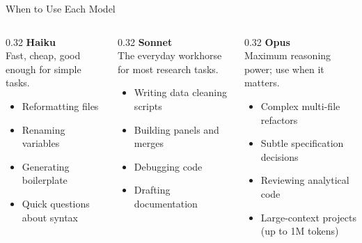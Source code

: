\documentclass[aspectratio=169, 11pt]{beamer}
\begin{document}
\begin{frame}{When to Use Each Model}
  \begin{columns}[T]
    \begin{column}{0.32\textwidth}
      \textbf{Haiku}\\[0.3em]
      {\small Fast, cheap, good enough for simple tasks.}
      \begin{itemize}
        \item Reformatting files
        \item Renaming variables
        \item Generating boilerplate
        \item Quick questions about syntax
      \end{itemize}
    \end{column}
    \begin{column}{0.32\textwidth}
      \textbf{Sonnet}\\[0.3em]
      {\small The everyday workhorse for most research tasks.}
      \begin{itemize}
        \item Writing data cleaning scripts
        \item Building panels and merges
        \item Debugging code
        \item Drafting documentation
      \end{itemize}
    \end{column}
    \begin{column}{0.32\textwidth}
      \textbf{Opus}\\[0.3em]
      {\small Maximum reasoning power; use when it matters.}
      \begin{itemize}
        \item Complex multi-file refactors
        \item Subtle specification decisions
        \item Reviewing analytical code
        \item Large-context projects (up to 1M tokens)
      \end{itemize}
    \end{column}
  \end{columns}
\end{frame}
\end{document}
